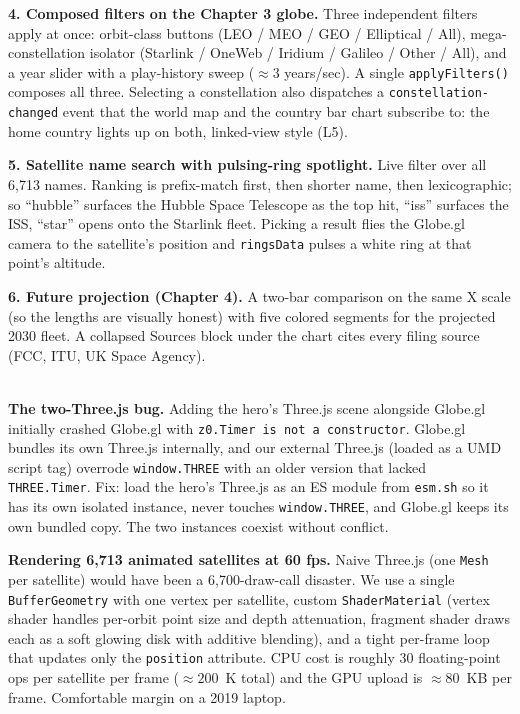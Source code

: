 \documentclass[9pt,a4paper]{article}
\newcommand{\subhead}[1]{%
  \vspace{4pt}%
  \noindent\tcbox[
    on line,
    colback=accentBlue!10!white, colframe=accentBlue,
    boxrule=0.3pt, arc=2.5pt,
    left=7pt, right=7pt, top=0.5pt, bottom=0.5pt,
  ]{\small\bfseries\color{accentBlue!85!black}#1}\\[2pt]%
}
\begin{document}
\textbf{4. Composed filters on the Chapter 3 globe.} Three independent filters apply at once: orbit-class buttons (LEO / MEO / GEO / Elliptical / All), mega-constellation isolator (Starlink / OneWeb / Iridium / Galileo / Other / All), and a year slider with a play-history sweep ($\approx 3$ years/sec). A single \texttt{applyFilters()} composes all three. Selecting a constellation also dispatches a \texttt{constellation-changed} event that the world map and the country bar chart subscribe to: the home country lights up on both, linked-view style (L5).

\textbf{5. Satellite name search with pulsing-ring spotlight.} Live filter over all 6{,}713 names. Ranking is prefix-match first, then shorter name, then lexicographic; so ``hubble'' surfaces the Hubble Space Telescope as the top hit, ``iss'' surfaces the ISS, ``star'' opens onto the Starlink fleet. Picking a result flies the Globe.gl camera to the satellite's position and \texttt{ringsData} pulses a white ring at that point's altitude.

\textbf{6. Future projection (Chapter 4).} A two-bar comparison on the same X scale (so the lengths are visually honest) with five colored segments for the projected 2030 fleet. A collapsed Sources block under the chart cites every filing source (FCC, ITU, UK Space Agency).

\vspace{3pt}

\subhead{Challenges, with what we did about each}

\textbf{The two-Three.js bug.} Adding the hero's Three.js scene alongside Globe.gl initially crashed Globe.gl with \texttt{z0.Timer is not a constructor}. Globe.gl bundles its own Three.js internally, and our external Three.js (loaded as a UMD script tag) overrode \texttt{window.THREE} with an older version that lacked \texttt{THREE.Timer}. Fix: load the hero's Three.js as an ES module from \texttt{esm.sh} so it has its own isolated instance, never touches \texttt{window.THREE}, and Globe.gl keeps its own bundled copy. The two instances coexist without conflict.

\textbf{Rendering 6{,}713 animated satellites at 60 fps.} Naive Three.js (one \texttt{Mesh} per satellite) would have been a 6{,}700-draw-call disaster. We use a single \texttt{BufferGeometry} with one vertex per satellite, custom \texttt{ShaderMaterial} (vertex shader handles per-orbit point size and depth attenuation, fragment shader draws each as a soft glowing disk with additive blending), and a tight per-frame loop that updates only the \texttt{position} attribute. CPU cost is roughly 30 floating-point ops per satellite per frame ($\approx 200$~K total) and the GPU upload is $\approx 80$~KB per frame. Comfortable margin on a 2019 laptop.
\end{document}

